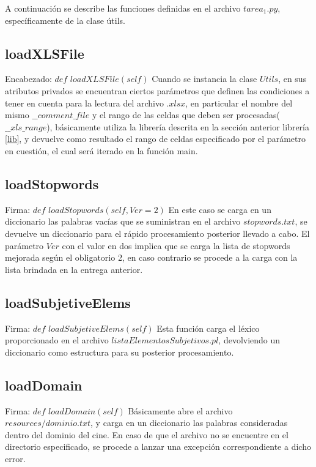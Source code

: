 \documentclass[12pt]{article}
\begin{document}
A continuación se describe las funciones definidas en el archivo $tarea_1.py$, específicamente de la clase útils.


\subsection{loadXLSFile} \label{xlslib}
Encabezado: $def$ $loadXLSFile(self)$
Cuando se instancia la clase $Utils$, en sus atributos privados se encuentran ciertos parámetros que definen las condiciones a tener en cuenta para la lectura del archivo $.xlsx$, en particular el nombre del mismo $\_\_comment\_file$ y el rango de las celdas que deben ser procesadas($\_\_xls\_range$), básicamente utiliza la librería descrita en la sección anterior librería \ref{lib}, y devuelve como resultado el rango de celdas especificado por el parámetro en cuestión, el cual será iterado en la función main.


\subsection{loadStopwords}\label{func:loadSW}
Firma: $def$ $loadStopwords(self, Ver=2)$
En este caso se carga en un diccionario las palabras vacías que se suministran en el archivo $stopwords.txt$, se devuelve un diccionario para el rápido procesamiento posterior llevado a cabo. El parámetro $Ver$ con el valor en dos implica que se carga la lista de stopwords mejorada según el obligatorio 2, en caso contrario se procede a la carga con la lista brindada en la entrega anterior.


\subsection{loadSubjetiveElems}
Firma: $def$ $loadSubjetiveElems(self)$
Esta función carga el léxico proporcionado en el archivo $listaElementosSubjetivos.pl$, devolviendo un diccionario como estructura para su posterior procesamiento.

\subsection{loadDomain}\label{func:loadDomain}
Firma: $def$ $loadDomain(self)$
Básicamente abre el archivo $resources/dominio.txt$, y carga en un diccionario las palabras consideradas dentro del dominio del cine. En caso de que el archivo no se encuentre en el directorio especificado, se procede a lanzar una excepción correspondiente a dicho error.
\end{document}
